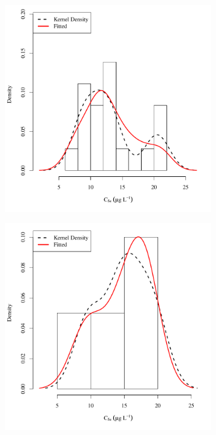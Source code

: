 \begin{linenumbers}
\subfiguremid
\begin{landscape}
	\begin{figure}
		\begin{subfigure}{0.7\textwidth}
			\centering
			\includegraphics[width=\tableCustomSize]{"Figures/Results_USR/Stochastic/Conc Model ResDist TIM"}
		\end{subfigure}%
		\begin{subfigure}{0.7\textwidth}
			\centering
			\includegraphics[width=\tableCustomSize]{"Figures/Results_USR/Stochastic/Conc Model ResDist HRC"}

\end{subfigure}
\end{figure}
\end{landscape}
\end{linenumbers}
